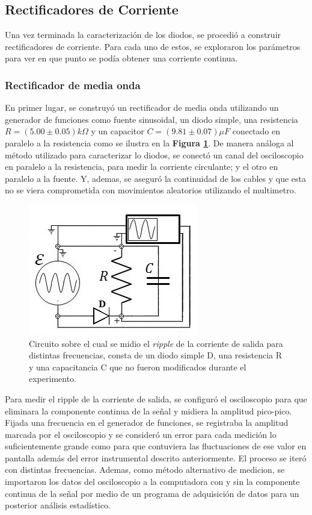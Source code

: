 \documentclass[11pt,a4paper]{article}
\begin{document}
\subsection{Rectificadores de Corriente}
Una vez terminada la caracterización de los diodos, se procedió a construir rectificadores de corriente. Para cada uno de estos, se exploraron los parámetros para ver en que punto se podía obtener una corriente continua.

\subsubsection{Rectificador de media onda}
En primer lugar, se construyó un rectificador de media onda utilizando un generador de funciones como fuente sinusoidal, un diodo simple, una resistencia $R = (5.00 \pm 0.05)k\Omega$ y un capacitor $C = (9.81 \pm 0.07)\mu F$ conectado en paralelo a la resistencia como se ilustra en la \textbf{Figura \ref{fig:Re-M-O}}. De manera análoga al método utilizado para caracterizar lo diodos, se conectó un canal del osciloscopio en paralelo a la resistencia, para medir la corriente circulante; y el otro en paralelo a la fuente. Y, ademas, se aseguró la continuidad de los cables y que esta no se viera comprometida con movimientos aleatorios utilizando el multimetro.

\begin{figure}[H]
\centering
\includegraphics[scale=0.8]{Rectificador-Media-Onda}
   \caption{Circuito sobre el cual se midio el \textit{ripple} de la corriente de salida para distintas frecuencias, consta de un diodo simple D, una resistencia R y una capacitancia C que no fueron modificados durante el experimento. }
   \label{fig:Re-M-O}
\end{figure}

Para medir el ripple de la corriente de salida, se configuró el osciloscopio para que eliminara la componente continua de la señal y midiera la amplitud pico-pico. Fijada una frecuencia en el generador de funciones, se registraba la amplitud marcada por el osciloscopio y se consideró un error para cada medición lo suficientemente grande como para que contuviera las fluctuaciones de ese valor en pantalla además del error instrumental descrito anteriormente. El proceso se iteró con distintas frecuencias.  Ademas, como método alternativo de medicion, se importaron los datos del osciloscopio a la computadora con y sin la componente continua de la señal por medio de un programa de adquisición de datos para un posterior análisis estadístico.
\end{document}
